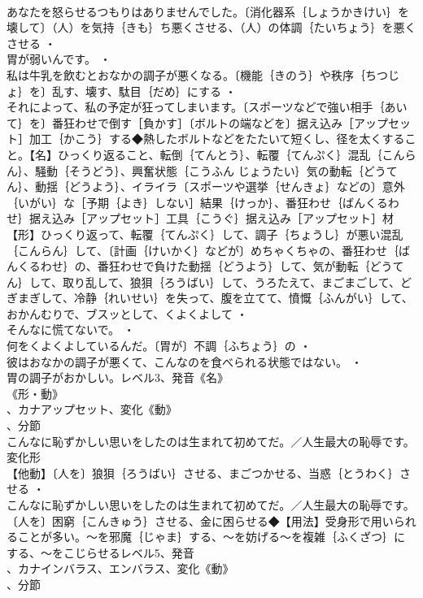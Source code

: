 \documentclass[8pt]{extreport}
\begin{document}
\begin{CJK}{UTF8}{min}
\\	あなたを怒らせるつもりはありませんでした。〔消化器系｛しょうかきけい｝を壊して〕（人）を気持｛きも｝ち悪くさせる、（人）の体調｛たいちょう｝を悪くさせる ・
\\	胃が弱いんです。 ・
\\	私は牛乳を飲むとおなかの調子が悪くなる。〔機能｛きのう｝や秩序｛ちつじょ｝を〕乱す、壊す、駄目｛だめ｝にする ・
\\	それによって、私の予定が狂ってしまいます。〔スポーツなどで強い相手｛あいて｝を〕番狂わせで倒す［負かす］〔ボルトの端などを〕据え込み［アップセット］加工｛かこう｝する◆熱したボルトなどをたたいて短くし、径を太くすること。【名】ひっくり返ること、転倒｛てんとう｝、転覆｛てんぷく｝混乱｛こんらん｝、騒動｛そうどう｝、興奮状態｛こうふん じょうたい｝気の動転｛どうてん｝、動揺｛どうよう｝、イライラ〔スポーツや選挙｛せんきょ｝などの〕意外｛いがい｝な［予期｛よき｝しない］結果｛けっか｝、番狂わせ｛ばんくるわせ｝据え込み［アップセット］工具｛こうぐ｝据え込み［アップセット］材【形】ひっくり返って、転覆｛てんぷく｝して、調子｛ちょうし｝が悪い混乱｛こんらん｝して、〔計画｛けいかく｝などが〕めちゃくちゃの、番狂わせ｛ばんくるわせ｝の、番狂わせで負けた動揺｛どうよう｝して、気が動転｛どうてん｝して、取り乱して、狼狽｛ろうばい｝して、うろたえて、まごまごして、どぎまぎして、冷静｛れいせい｝を失って、腹を立てて、憤慨｛ふんがい｝して、おかんむりで、ブスッとして、くよくよして ・
\\	そんなに慌てないで。 ・
\\	何をくよくよしているんだ。〔胃が〕不調｛ふちょう｝の ・
\\	彼はおなかの調子が悪くて、こんなのを食べられる状態ではない。 ・
\\	胃の調子がおかしい。レベル3、発音《名》
\\	《形・動》
\\	、カナアップセット、変化《動》
\\	、分節
\\	こんなに恥ずかしい思いをしたのは生まれて初めてだ。／人生最大の恥辱です。	変化形 
\\	【他動】〔人を〕狼狽｛ろうばい｝させる、まごつかせる、当惑｛とうわく｝させる ・
\\	こんなに恥ずかしい思いをしたのは生まれて初めてだ。／人生最大の恥辱です。〔人を〕困窮｛こんきゅう｝させる、金に困らせる◆【用法】受身形で用いられることが多い。～を邪魔｛じゃま｝する、～を妨げる～を複雑｛ふくざつ｝にする、～をこじらせるレベル5、発音
\\	、カナインバラス、エンバラス、変化《動》
\\	、分節

\end{CJK}
\end{document}
